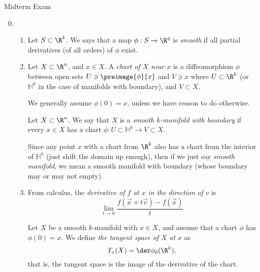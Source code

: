 \documentclass[12pt,letterpaper]{article}
\let\oldphi\phi
\renewcommand{\phi}{\oldphi}
\renewcommand{\H}{\mathbb{H}}
\begin{document}
\pagestyle{fancy}
\begin{center}
{\Large Midterm Exam}%
\end{center}


\begin{enumerate}


\setcounter{enumi}{-1}
\item 
	\begin{enumerate}[label=(\alph*)]
	\item \mbox{}	\vspace*{-1.33\baselineskip}
	\begin{definition*}
	Let $S\subset \R^k$. We says that a map $\phi:S\to \R^q$ is \emph{smooth} if all partial derivatives (of all orders) of $\phi$ exist.
	\end{definition*}
	
	\item \mbox{}	\vspace*{-1.33\baselineskip}
	\begin{definition*}
	Let $X\subset\R^n$, and $x\in X$. A \emph{chart of $X$ near $x$} is a diffeomorphism $\phi$ between open sets $U\ni \preimage{\phi}{x}$ and $V\ni x$ where $U \subset \R^k$ (or $	\H^k$ in the case of manifolds with boundary), and $V\subset X$. 
	\end{definition*}		
	\begin{remark*}
	We generally assume $\phi(0)=x$, unless we have reason to do otherwise. 
	\end{remark*}
	\begin{definition*}
	Let $X\subset\R^n$. We say that $X$ is a \emph{smooth $k$-manifold with boundary} if every $x\in X$ has a chart $\phi:U\subset \H^k \to V\subset X$. 
	\end{definition*}
	
	\begin{remark*}
	Since any point $x$ with a chart from $\R^k$ also has a chart from the interior of $\H^k$ (just shift the domain up enough), then if we just say \emph{smooth manifold}, we mean a smooth manifold with boundary (whose boundary may or may not empty).
	\end{remark*}
	
	\item \mbox{}	\vspace*{-1.33\baselineskip}
	\begin{definition*}
	From calculus, the \emph{derivative of $f$ at $x$ in the direction of $v$} is 
	$$\lim_{t\to0}\frac{f(\vec x+t\vec v)-f(\vec x)}{t}$$
	\end{definition*}
	\begin{definition*}
	Let $X$ be a smooth $k$-manifold with $x\in X$, and assume that a chart $\phi$ has $\phi(0)=x$. We define \emph{the tangent space of $X$ at $x$} as 
	$$T_x(X)=\der\phi_0(\R^k),$$
	that is, the tangent space is the image of the derivative of the chart.
	\end{definition*}
	

\end{enumerate}
\end{enumerate}
\end{document}

